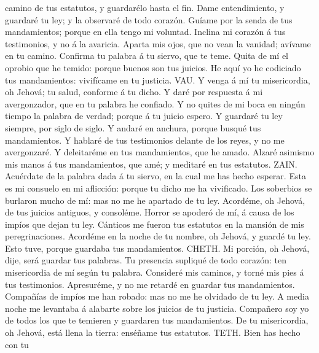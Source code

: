 camino de tus estatutos, y guardarélo hasta el fin.  Dame
entendimiento, y guardaré tu ley; y la observaré de todo corazón.
 Guíame por la senda de tus mandamientos; porque en ella
tengo mi voluntad.  Inclina mi corazón á tus testimonios,
y no á la avaricia.  Aparta mis ojos, que no vean la
vanidad; avívame en tu camino.  Confirma tu palabra á tu
siervo, que te teme.  Quita de mí el oprobio que he
temido: porque buenos son tus juicios.  He aquí yo he
codiciado tus mandamientos: vivifícame en tu justicia. 
VAU. Y venga á mí tu misericordia, oh Jehová; tu salud, conforme á tu
dicho.  Y daré por respuesta á mi avergonzador, que en tu
palabra he confiado.  Y no quites de mi boca en ningún
tiempo la palabra de verdad; porque á tu juicio espero. 
Y guardaré tu ley siempre, por siglo de siglo.  Y andaré
en anchura, porque busqué tus mandamientos.  Y hablaré de
tus testimonios delante de los reyes, y no me avergonzaré.
 Y deleitaréme en tus mandamientos, que he amado.
 Alzaré asimismo mis manos á tus mandamientos, que amé; y
meditaré en tus estatutos.  ZAIN. Acuérdate de la palabra
dada á tu siervo, en la cual me has hecho esperar.  Esta
es mi consuelo en mi aflicción: porque tu dicho me ha vivificado.
 Los soberbios se burlaron mucho de mí: mas no me he
apartado de tu ley.  Acordéme, oh Jehová, de tus juicios
antiguos, y consoléme.  Horror se apoderó de mí, á causa
de los impíos que dejan tu ley.  Cánticos me fueron tus
estatutos en la mansión de mis peregrinaciones.  Acordéme
en la noche de tu nombre, oh Jehová, y guardé tu ley. 
Esto tuve, porque guardaba tus mandamientos.  CHETH. Mi
porción, oh Jehová, dije, será guardar tus palabras.  Tu
presencia supliqué de todo corazón: ten misericordia de mí según tu
palabra.  Consideré mis caminos, y torné mis pies á tus
testimonios.  Apresuréme, y no me retardé en guardar tus
mandamientos.  Compañías de impíos me han robado: mas no
me he olvidado de tu ley.  A media noche me levantaba á
alabarte sobre los juicios de tu justicia.  Compañero soy
yo de todos los que te temieren y guardaren tus mandamientos.
 De tu misericordia, oh Jehová, está llena la tierra:
enséñame tus estatutos.  TETH. Bien has hecho con tu
